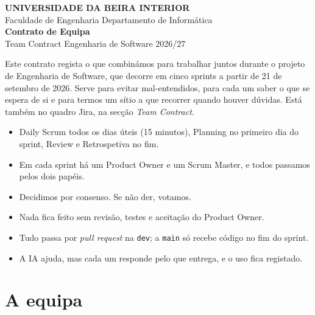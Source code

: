 \documentclass[11pt,a4paper]{article}
\begin{document}
\thispagestyle{primeira}

\begin{tcolorbox}[colback=azul, colframe=azul, coltext=white, arc=3pt, boxrule=0pt,
    left=16pt, right=16pt, top=14pt, bottom=14pt]
  \sffamily
  {\footnotesize\bfseries\MakeUppercase{Universidade da Beira Interior}}\\[2pt]
  {\footnotesize Faculdade de Engenharia \textperiodcentered{} Departamento de Informática}\\[16pt]
  {\fontsize{28}{32}\selectfont\bfseries Contrato de Equipa}\\[4pt]
  {\large Team Contract \textperiodcentered{} Engenharia de Software 2026/27}
\end{tcolorbox}

Este contrato regista o que combinámos para trabalhar juntos durante o projeto de Engenharia de Software, que decorre em cinco sprints a partir de 21 de setembro de 2026. Serve para evitar mal-entendidos, para cada um saber o que se espera de si e para termos um sítio a que recorrer quando houver dúvidas. Está também no quadro Jira, na secção \textit{Team Contract}.

\begin{tcolorbox}[caixa, title={Em resumo}, colback=azulclaro!60]
  \begin{itemize}
    \item Daily Scrum todos os dias úteis (15 minutos), Planning no primeiro dia do sprint, Review e Retrospetiva no fim.
    \item Em cada sprint há um Product Owner e um Scrum Master, e todos passamos pelos dois papéis.
    \item Decidimos por consenso. Se não der, votamos.
    \item Nada fica feito sem revisão, testes e aceitação do Product Owner.
    \item Tudo passa por \textit{pull request} na \texttt{dev}; a \texttt{main} só recebe código no fim do sprint.
    \item A IA ajuda, mas cada um responde pelo que entrega, e o uso fica registado.
  \end{itemize}
\end{tcolorbox}

\section*{A equipa}
\end{document}

